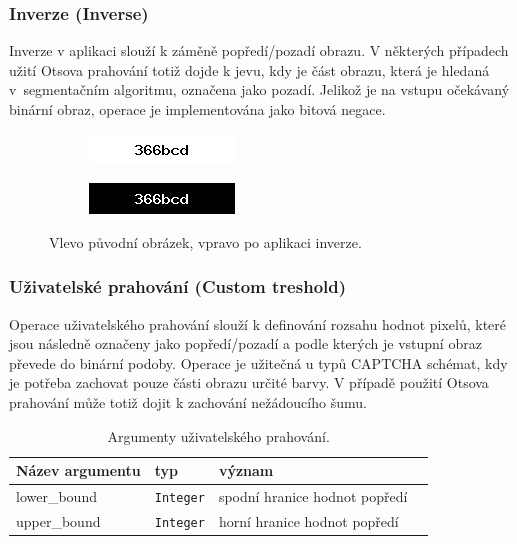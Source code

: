 \documentclass[
  field=ainfp,
  master=true,
  biblatex,
  sourcecodes=false,
  theorems=false,
  glossaries,
  index
]{kidiplom}
\begin{document}
\subsubsection*{Inverze (Inverse)}
Inverze v aplikaci slouží k záměně popředí/pozadí obrazu. V některých případech užití Otsova prahování totiž dojde k jevu, kdy je část obrazu, která je hledaná v~segmentačním algoritmu, označena jako pozadí. Jelikož je na vstupu očekávaný binární obraz, operace je implementována jako bitová negace.
\begin{figure}[H]
\centering
\begin{subfigure}{.5\textwidth}
  \centering
  \includegraphics[width=.8\linewidth]{images/inverse_original.png}
\end{subfigure}%
\begin{subfigure}{.5\textwidth}
  \centering
  \includegraphics[width=.8\linewidth]{images/inverse_result.png}
\end{subfigure}
\caption{Vlevo původní obrázek, vpravo po aplikaci inverze.}
\label{fig:inverse_example}
\end{figure}

\subsubsection*{Uživatelské prahování (Custom treshold)}
Operace uživatelského prahování slouží k definování rozsahu hodnot pixelů, které jsou následně označeny jako popředí/pozadí a podle kterých je vstupní obraz převede do binární podoby. Operace je užitečná u typů CAPTCHA schémat, kdy je potřeba zachovat pouze části obrazu určité barvy. V případě použití Otsova prahování může totiž dojit k zachování nežádoucího šumu.

\begin{table}[H]
\centering
\begin{tabular}{|l|l|l|l|}
\hline
\textbf{Název argumentu} & \textbf{typ} & \textbf{význam}
\\ \hline
lower\_bound & \texttt{Integer} & spodní hranice hodnot popředí
\\ \hline
upper\_bound & \texttt{Integer} & horní hranice hodnot popředí
\\ \hline
\end{tabular}
\caption{Argumenty uživatelského prahování.}
\end{table}
\end{document}

